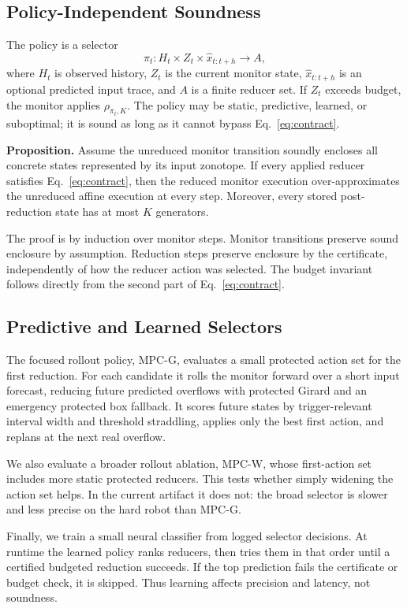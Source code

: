 \documentclass{article}
\newcommand{\mpcg}{\textsc{MPC-G}\xspace}
\newcommand{\mpcw}{\textsc{MPC-W}\xspace}
\newcommand{\reduce}{\rho}
\begin{document}
\subsection{Policy-Independent Soundness}

The policy is a selector
\[
  \pi_t : H_t \times Z_t \times \widehat{x}_{t:t+h} \rightarrow A,
\]
where \(H_t\) is observed history, \(Z_t\) is the current monitor state,
\(\widehat{x}_{t:t+h}\) is an optional predicted input trace, and \(A\) is a
finite reducer set. If \(Z_t\) exceeds budget, the monitor applies
\(\reduce_{\pi_t,K}\). The policy may be static, predictive, learned, or
suboptimal; it is sound as long as it cannot bypass Eq.~\eqref{eq:contract}.

\textbf{Proposition.}
Assume the unreduced monitor transition soundly encloses all concrete states
represented by its input zonotope. If every applied reducer satisfies
Eq.~\eqref{eq:contract}, then the reduced monitor execution over-approximates
the unreduced affine execution at every step. Moreover, every stored
post-reduction state has at most \(K\) generators.

The proof is by induction over monitor steps. Monitor transitions preserve
sound enclosure by assumption. Reduction steps preserve enclosure by the
certificate, independently of how the reducer action was selected. The budget
invariant follows directly from the second part of Eq.~\eqref{eq:contract}.

\subsection{Predictive and Learned Selectors}

The focused rollout policy, \mpcg, evaluates a small protected action set for
the first reduction. For each candidate it rolls the monitor forward over a
short input forecast, reducing future predicted overflows with protected Girard
and an emergency protected box fallback. It scores future states by
trigger-relevant interval width and threshold straddling, applies only the best
first action, and replans at the next real overflow.

We also evaluate a broader rollout ablation, \mpcw, whose first-action set
includes more static protected reducers. This tests whether simply widening the
action set helps. In the current artifact it does not: the broad selector is
slower and less precise on the hard robot than \mpcg.

Finally, we train a small neural classifier from logged selector decisions. At
runtime the learned policy ranks reducers, then tries them in that order until a
certified budgeted reduction succeeds. If the top prediction fails the
certificate or budget check, it is skipped. Thus learning affects precision and
latency, not soundness.
\end{document}

